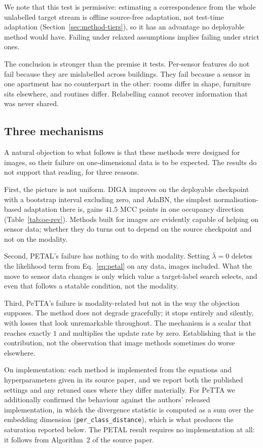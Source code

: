 \documentclass[a4paper,fleqn]{cas-dc}
\begin{document}
We note that this test is permissive: estimating a correspondence from the whole
unlabelled target stream is offline source-free adaptation, not test-time adaptation
(Section~\ref{sec:method-tiers}), so it has an advantage no deployable method would have.
Failing under relaxed assumptions implies failing under strict ones.

The conclusion is stronger than the premise it tests. Per-sensor features do not fail
because they are mislabelled across buildings. They fail because a sensor in one
apartment has no counterpart in the other: rooms differ in shape, furniture sits
elsewhere, and routines differ. Relabelling cannot recover information that was never
shared.

\subsection{Three mechanisms}
\label{sec:res-mech-intro}

A natural objection to what follows is that these methods were designed for images, so
their failure on one-dimensional data is to be expected. The results do not support that
reading, for three reasons.

First, the picture is not uniform. DIGA improves on the deployable checkpoint with a
bootstrap interval excluding zero, and AdaBN, the simplest normalisation-based
adaptation there is, gains $41.5$ MCC points in one occupancy direction
(Table~\ref{tab:oe-rev}). Methods built for images are evidently capable of helping on
sensor data; whether they do turns out to depend on the source checkpoint and not on
the modality.

Second, PETAL's failure has nothing to do with modality. Setting $\bar\lambda=0$ deletes
the likelihood term from Eq.~\ref{eq:petal} on any data, images included. What the move to
sensor data changes is only which value a target-label search selects, and even that
follows a statable condition, not the modality.

Third, PeTTA's failure is modality-related but not in the way the objection supposes. The
method does not degrade gracefully; it stops entirely and silently, with losses that look
unremarkable throughout. The mechanism is a scalar that reaches exactly $1$ and multiplies
the update rate by zero. Establishing that is the contribution, not the observation that
image methods sometimes do worse elsewhere.

On implementation: each method is implemented from the equations and hyperparameters given
in its source paper, and we report both the published settings and any retuned ones where
they differ materially. For PeTTA we additionally confirmed the behaviour against the
authors' released implementation, in which the divergence statistic is computed as a sum
over the embedding dimension (\texttt{per\_class\_distance}), which is what produces the
saturation reported below. The PETAL result requires no implementation at all: it follows
from Algorithm~2 of the source paper.
\label{sec:res-mech}
\end{document}
